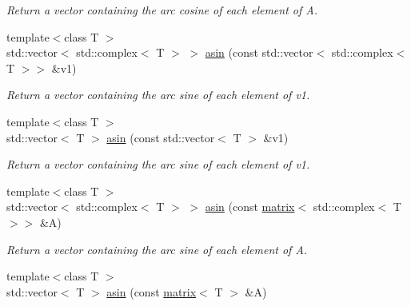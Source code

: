\begin{DoxyCompactItemize}
\begin{DoxyCompactList}\small\item\em Return a vector containing the arc cosine of each element of A. \end{DoxyCompactList}\item 
\hypertarget{namespacekeycpp_ac038300a49474532929f16d892349ab6}{{\footnotesize template$<$class T $>$ }\\std\-::vector$<$ std\-::complex$<$ T $>$ $>$ \hyperlink{namespacekeycpp_ac038300a49474532929f16d892349ab6}{asin} (const std\-::vector$<$ std\-::complex$<$ T $>$$>$ \&v1)}\label{namespacekeycpp_ac038300a49474532929f16d892349ab6}

\begin{DoxyCompactList}\small\item\em Return a vector containing the arc sine of each element of v1. \end{DoxyCompactList}\item 
\hypertarget{namespacekeycpp_aba2b31e627ef6a9d04239fa435d81e9e}{{\footnotesize template$<$class T $>$ }\\std\-::vector$<$ T $>$ \hyperlink{namespacekeycpp_aba2b31e627ef6a9d04239fa435d81e9e}{asin} (const std\-::vector$<$ T $>$ \&v1)}\label{namespacekeycpp_aba2b31e627ef6a9d04239fa435d81e9e}

\begin{DoxyCompactList}\small\item\em Return a vector containing the arc sine of each element of v1. \end{DoxyCompactList}\item 
\hypertarget{namespacekeycpp_ad1781a15fc7aa5de38db6e4eb92c9e22}{{\footnotesize template$<$class T $>$ }\\std\-::vector$<$ std\-::complex$<$ T $>$ $>$ \hyperlink{namespacekeycpp_ad1781a15fc7aa5de38db6e4eb92c9e22}{asin} (const \hyperlink{classkeycpp_1_1matrix}{matrix}$<$ std\-::complex$<$ T $>$$>$ \&A)}\label{namespacekeycpp_ad1781a15fc7aa5de38db6e4eb92c9e22}

\begin{DoxyCompactList}\small\item\em Return a vector containing the arc sine of each element of A. \end{DoxyCompactList}\item 
\hypertarget{namespacekeycpp_a8bb201db3ca1ccd6eca8fd7395f17539}{{\footnotesize template$<$class T $>$ }\\std\-::vector$<$ T $>$ \hyperlink{namespacekeycpp_a8bb201db3ca1ccd6eca8fd7395f17539}{asin} (const \hyperlink{classkeycpp_1_1matrix}{matrix}$<$ T $>$ \&A)}\label{namespacekeycpp_a8bb201db3ca1ccd6eca8fd7395f17539}


\end{DoxyCompactItemize}
